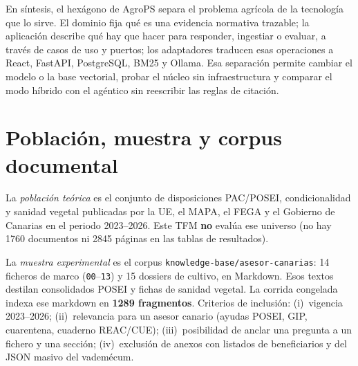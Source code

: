 En síntesis, el hexágono de AgroPS separa el problema agrícola de la tecnología que lo sirve. El dominio fija qué es una evidencia normativa trazable; la aplicación describe qué hay que hacer para responder, ingestiar o evaluar, a través de casos de uso y puertos; los adaptadores traducen esas operaciones a React, FastAPI, PostgreSQL, BM25 y Ollama. Esa separación permite cambiar el modelo o la base vectorial, probar el núcleo sin infraestructura y comparar el modo híbrido con el agéntico sin reescribir las reglas de citación.

\section{Población, muestra y corpus documental}

La \emph{población teórica} es el conjunto de disposiciones PAC/POSEI, condicionalidad y sanidad vegetal publicadas por la UE, el MAPA, el FEGA y el Gobierno de Canarias en el periodo 2023--2026. Este TFM \textbf{no} evalúa ese universo (no hay 1760 documentos ni 2845 páginas en las tablas de resultados).

La \emph{muestra experimental} es el corpus \texttt{knowledge-base/asesor-canarias}: 14 ficheros de marco (\texttt{00}--\texttt{13}) y 15 dossiers de cultivo, en Markdown. Esos textos destilan consolidados POSEI y fichas de sanidad vegetal. La corrida congelada indexa ese markdown en \textbf{1289 fragmentos}. Criterios de inclusión: (i)~vigencia 2023--2026; (ii)~relevancia para un asesor canario (ayudas POSEI, GIP, cuarentena, cuaderno REAC/CUE); (iii)~posibilidad de anclar una pregunta a un fichero y una sección; (iv)~exclusión de anexos con listados de beneficiarios y del JSON masivo del vademécum.

